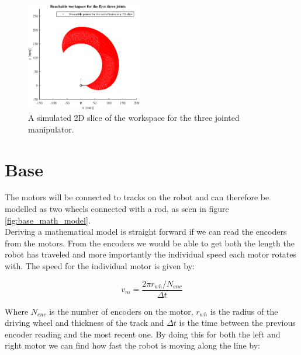 \begin{figure}[H]
    \centering
    \includegraphics[width=0.45\textwidth]{chapters/img/workspace.eps}
    \caption{A simulated 2D slice of the workspace for the three jointed manipulator.}
    \label{fig:workspace_simulated}
\end{figure}


















\section*{Base}

The motors will be connected to tracks on the robot and can therefore be modelled as two wheels connected with a rod, as seen in figure \ref{fig:base_math_model}.\\ 
Deriving a mathematical model is straight forward if we can read the encoders from the motors. From the encoders we would be able to get both the length the robot has traveled and more importantly the individual speed each motor rotates with. The speed for the individual motor is given by: 

\begin{equation}
    v_m=\frac{2\pi r_{wh}/N_{enc}}{\Delta t}
    \label{eq:base_system_eq1}
\end{equation}

\noindent Where $N_{enc}$ is the number of encoders on the motor, $r_{wh}$ is the radius of the driving wheel and thickness of the track and $\Delta t$ is the time between the previous encoder reading and the most recent one. By doing this for both the left and right motor we can find how fast the robot is moving along the line by:

